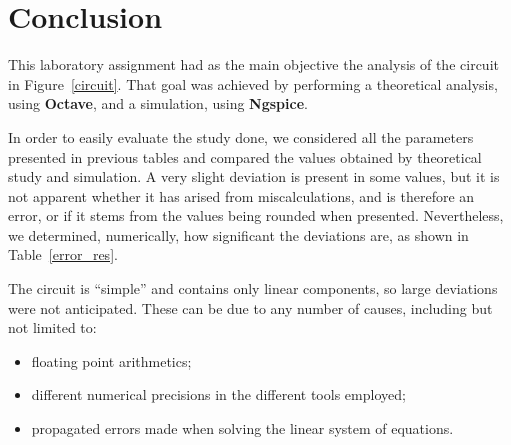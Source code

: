\section{Conclusion}
\label{sec:conclusion}

This laboratory assignment had as the main objective the analysis of the circuit in Figure~\ref{circuit}. That goal was achieved by performing a theoretical analysis, using {\bf Octave}, and a simulation, using {\bf Ngspice}.

In order to easily evaluate the study done, we considered all the parameters presented in previous tables and compared the values obtained by theoretical study and simulation. A very slight deviation is present in some values, but it is not apparent whether it has arised from miscalculations, and is therefore an error, or if it stems from the values being rounded when presented. Nevertheless, we determined, numerically, how significant the deviations are, as shown in Table~\ref{error_res}.



The circuit is ``simple'' and contains only linear components, so large deviations were not anticipated. These can be due to any number of causes, including but not limited to:

\begin{itemize}
\item floating point arithmetics;
\item different numerical precisions in the different tools employed;
\item propagated errors made when solving the linear system of equations.
\end{itemize}



